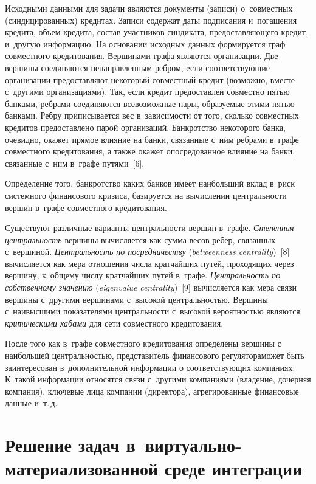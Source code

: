 \begin{multicols}{2}
      Исходными данными для задачи являются документы (записи) 
о~совместных (синдицированных) кредитах. Записи содержат даты подписания 
и~погашения кредита, объем кредита, состав участников синдиката, 
предоставляющего кредит, и~другую информацию. На основании исходных 
данных формируется граф совместного кредитования. Вершинами графа 
являются организации. Две вершины соединяются ненаправленным ребром, 
если соответствующие организации предоставляют некоторый совместный 
кредит (возможно, вместе с~другими организациями). Так, если кредит 
предоставлен совместно пятью банками, ребрами соединяются всевозможные 
пары, образуемые этими пятью банками. Ребру приписывается вес 
в~зависимости от того, сколько совместных кредитов предоставлено парой 
организаций. Банкротство некоторого банка, очевидно, окажет прямое влияние 
на банки, связанные с~ним ребрами в~графе совместного кредитования, а также 
окажет опосредованное влияние на банки, связанные с~ним в~графе путями~[6].
      
      Определение того, банкротство каких банков имеет наибольший вклад 
      в~риск системного финансового кризиса, базируется на вычислении 
центральности вершин в~графе совместного кредитования. 
      
      Существуют различные варианты централь\-ности вершин в~графе. 
\textit{Степенная центральность} вершины вычисляется как сумма весов 
ребер, связанных с~вершиной. \textit{Центральность по посредничеству} 
(\textit{betweenness centrality})~[8] вычисляется как мера отношения числа 
кратчайших путей, проходящих через вершину, к~общему числу кратчайших 
путей в~графе. \textit{Центральность по собственному значению} 
(\textit{eigenvalue centrality})~[9] вычисляется как мера связи вершины 
с~другими вершинами с~высокой центральностью. Вершины с~наивысшими 
показателями центральности с~высокой вероятностью являются 
\textit{критическими хабами} для сети совместного кредитования.
      
      После того как в~графе совместного кредитования определены вершины 
с наибольшей центральностью, представитель финансового регулятора\linebreak может 
быть заинтересован в~дополнительной информации о соответствующих 
компаниях. К~такой информации относятся связи с~другими компаниями 
(владение, дочерняя компания), ключевые лица компании (директора), 
агрегированные финансовые данные и~т.\,д. 

\vspace*{-4pt}
      
\section{Решение задач в~виртуально-материализованной среде 
интеграции} 


\end{multicols}
